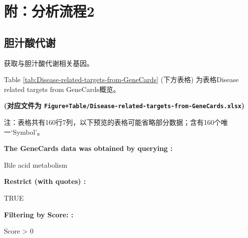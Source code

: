 \documentclass[
]{article}
\begin{document}
\hypertarget{workflow2}{%
\section{附：分析流程2}\label{workflow2}}

\hypertarget{ux80c6ux6c41ux9178ux4ee3ux8c22}{%
\subsection{胆汁酸代谢}\label{ux80c6ux6c41ux9178ux4ee3ux8c22}}

获取与胆汁酸代谢相关基因。

Table \ref{tab:Disease-related-targets-from-GeneCards} (下方表格) 为表格Disease related targets from GeneCards概览。

\textbf{(对应文件为 \texttt{Figure+Table/Disease-related-targets-from-GeneCards.xlsx})}

\begin{center}\begin{tcolorbox}[colback=gray!10, colframe=gray!50, width=0.9\linewidth, arc=1mm, boxrule=0.5pt]注：表格共有160行7列，以下预览的表格可能省略部分数据；含有160个唯一`Symbol'。
\end{tcolorbox}
\end{center}\begin{center}\begin{tcolorbox}[colback=gray!10, colframe=gray!50, width=0.9\linewidth, arc=1mm, boxrule=0.5pt]
\textbf{
The GeneCards data was obtained by querying
:}

\vspace{0.5em}

    Bile acid metabolism

\vspace{2em}


\textbf{
Restrict (with quotes)
:}

\vspace{0.5em}

    TRUE

\vspace{2em}


\textbf{
Filtering by Score:
:}

\vspace{0.5em}

    Score > 0

\vspace{2em}
\end{tcolorbox}
\end{center}
\end{document}
